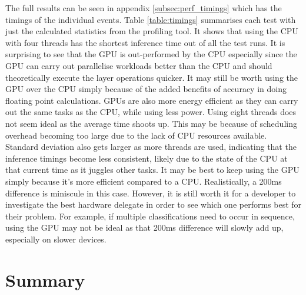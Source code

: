 \documentclass[12pt,a4paper]{report}
\begin{document}
The full results can be seen in appendix \ref{subsec:perf_timings} which has the timings of the individual events. Table \ref{table:timings} 
summarises each test with just the calculated statistics from the profiling tool. It shows that using the CPU with four 
threads has the shortest inference time out of all the test runs. It is surprising to see that the GPU is out-performed 
by the CPU especially since the GPU can carry out parallelise workloads better than the CPU and should theoretically 
execute the layer operations quicker. It may still be worth using the GPU over the CPU simply because of the added 
benefits of accuracy in doing floating point calculations. GPUs are also more energy efficient as they can carry out the
same tasks as the CPU, while using less power. Using eight threads does not seem ideal as the average time shoots up. 
This may be because of scheduling overhead becoming too large due to the lack of CPU resources available. 
Standard deviation also gets larger as more threads are used, indicating that the inference timings become less 
consistent, likely due to the state of the CPU at that current time as it juggles other tasks. It may be best to keep 
using the GPU simply because it's more efficient compared to a CPU. Realistically, a 200ms difference is miniscule in 
this case. However, it is still worth it for a developer to investigate the best hardware delegate in order to see 
which one performs best for their problem. For example, if multiple classifications need to occur in sequence, using 
the GPU may not be ideal as that 200ms difference will slowly add up, especially on slower devices. 

\section{Summary}
\end{document}
